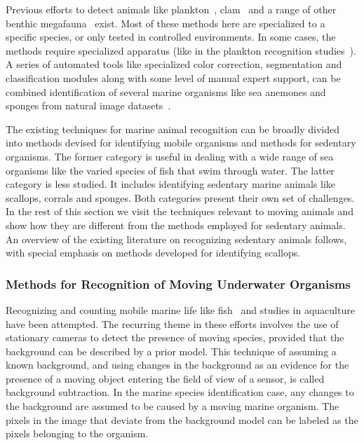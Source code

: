 \documentclass {udthesis}
\begin{document}
Previous efforts to detect animals like plankton~\cite{mcgavin_plankton, stelzer_rotifier}, clam~\cite{forrest_clam} and a range of other benthic megafauna~\cite{schoening} exist. Most of these methods here are specialized to a specific species, or only tested in controlled environments. In some cases, the methods require specialized apparatus (like in the plankton recognition studies~\cite{mcgavin_plankton, stelzer_rotifier}). 
A series of automated tools like specialized color correction, segmentation and classification modules along with some level of manual expert support, can be combined identification of several marine organisms like sea anemones and sponges from natural image datasets~\cite{schoening}. 

The existing techniques for marine animal recognition can be broadly divided into methods devised for identifying mobile organisms and methods for sedentary organisms. The former category is useful in dealing with a wide range of sea organisms like the varied species of fish that swim through water. The latter category is less studied. It includes identifying sedentary marine animals like scallops, corrals and sponges. Both categories present their own set of challenges. In the rest of this section we visit the techniques relevant to moving animals and show how they are different from the methods employed for sedentary animals. An overview of the existing literature on recognizing sedentary animals follows, with special emphasis on methods developed for identifying scallops.


\subsubsection{Methods for Recognition of Moving Underwater Organisms}

Recognizing and counting mobile marine life like fish~\cite{spampinato, edgington, williams} and studies in aquaculture \cite{zion} have been attempted. The recurring theme in these efforts involves the use of stationary cameras to detect the presence of moving species, provided that the background can be described by a prior model. This technique of assuming a known background, and using changes in the background as an evidence for the presence of a moving object entering the field of view of a sensor, is called background subtraction. In the marine species identification case, any changes to the background are assumed to be caused by a moving marine organism. The pixels in the image that deviate from the background model can be labeled as the pixels belonging to the organism.
\end{document}
